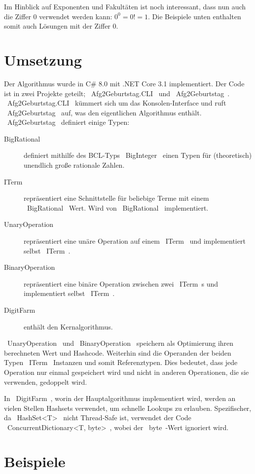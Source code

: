 \documentclass{article}
\theoremstyle{nonumberplain}
\begin{document}
Im Hinblick auf Exponenten und Fakultäten ist noch interessant, dass nun auch die Ziffer \(0\) verwendet werden kann:
\(0^0 = 0! = 1\).
Die Beispiele unten enthalten somit auch Lösungen mit der Ziffer \(0\).

\section{Umsetzung}

Der Algorithmus wurde in C\# 8.0 mit .NET Core 3.1 implementiert.
Der Code ist in zwei Projekte geteilt;
~Afg2Geburtstag.CLI~ und ~Afg2Geburtstag~.
~Afg2Geburtstag.CLI~ kümmert sich um das Konsolen-Interface und ruft ~Afg2Geburtstag~ auf, was den eigentlichen Algorithmus enthält.
~Afg2Geburtstag~ definiert einige Typen:

\begin{description}
    \item[BigRational] definiert mithilfe des BCL-Typs ~BigInteger~ einen Typen für (theoretisch) unendlich große rationale Zahlen.
    \item[ITerm] repräsentiert eine Schnittstelle für beliebige Terme mit einem ~BigRational~ Wert. Wird von ~BigRational~ implementiert.
    \item[UnaryOperation] repräsentiert eine unäre Operation auf einem ~ITerm~ und implementiert selbst ~ITerm~.
    \item[BinaryOperation] repräsentiert eine binäre Operation zwischen zwei ~ITerm~s und implementiert selbst ~ITerm~.
    \item[DigitFarm] enthält den Kernalgorithmus.
\end{description}

~UnaryOperation~ und ~BinaryOperation~ speichern als Optimierung ihren berechneten Wert und Hashcode.
Weiterhin sind die Operanden der beiden Typen ~ITerm~ Instanzen und somit Referenztypen.
Dies bedeutet, dass jede Operation nur einmal gespeichert wird und nicht in anderen Operationen, die sie verwenden, gedoppelt wird.

In ~DigitFarm~, worin der Hauptalgorithmus implementiert wird, werden an vielen Stellen Hashsets verwendet, um schnelle Lookups zu erlauben.
Spezifischer, da ~HashSet<T>~ nicht Thread-Safe ist, verwendet der Code ~ConcurrentDictionary<T, byte>~, wobei der ~byte~-Wert ignoriert wird.

\section{Beispiele}
\end{document}
